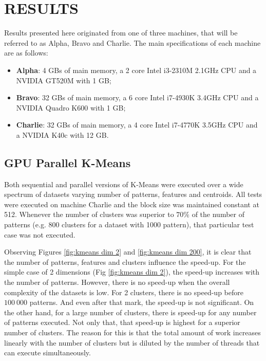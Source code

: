 \section{\uppercase{Results}}
\label{sec:resul}

Results presented here originated from one of three machines, that will be referred to as Alpha, Bravo and Charlie.
The main specifications of each machine are as follows:
\begin{itemize}
  \item \textbf{Alpha}: 4 GBs of main memory, a 2 core Intel i3-2310M 2.1GHz CPU and a NVIDIA GT520M with 1 GB;
  \item \textbf{Bravo}: 32 GBs of main memory, a 6 core Intel i7-4930K 3.4GHz CPU and a NVIDIA Quadro K600 with 1 GB;
  \item \textbf{Charlie}: 32 GBs of main memory, a 4 core Intel i7-4770K 3.5GHz CPU and a NVIDIA K40c with 12 GB.
\end{itemize}

\subsection{GPU Parallel K-Means}

Both sequential and parallel versions of K-Means were executed over a wide spectrum of datasets varying number of patterns, features and centroids.
All tests were executed on machine Charlie and the block size was maintained constant at 512.
Whenever the number of clusters was superior to $70\%$ of the number of patterns (e.g. 800 clusters for a dataset with 1000 pattern), that particular test case was not executed.


Observing Figures \ref{fig:kmeans dim 2} and \ref{fig:kmeans dim 200}, it is clear that the number of patterns, features and clusters influence the speed-up.
For the simple case of 2 dimensions (Fig \ref{fig:kmeans dim 2}), the speed-up increases with the number of patterns.
However, there is no speed-up when the overall complexity of the datasets is low.
For 2 clusters, there is no speed-up before $100 \: 000$ patterns.
And even after that mark, the speed-up is not significant.
On the other hand, for a large number of clusters, there is speed-up for any number of patterns executed.
Not only that, that speed-up is highest for a superior number of clusters.
The reason for this is that the total amount of work increases linearly with the number of clusters but is diluted by the number of threads that can execute simultaneously.

